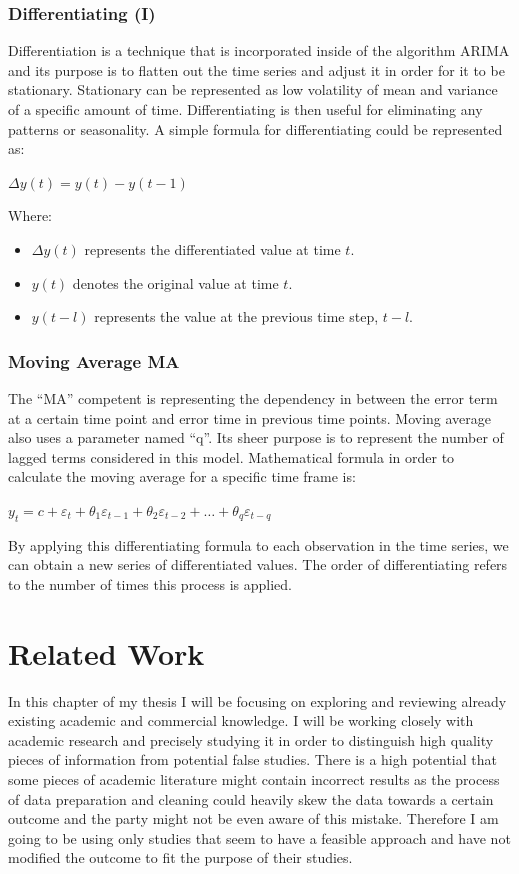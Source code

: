 \documentclass{imc-inf}
\begin{document}
	\subsection{Differentiating (I)}
	Differentiation is a technique that is incorporated inside of the algorithm ARIMA and its purpose is to flatten out the time series and
	adjust it in order for it to be stationary. Stationary can be represented as low volatility of mean and variance of a specific amount of time.
	Differentiating is then useful for eliminating any patterns or seasonality. A simple formula for differentiating could be represented as: 
	
	$\Delta y(t) = y(t) - y(t-1)$
	
	Where:
	\begin{itemize}
		\item $\Delta y(t)$ represents the differentiated value at time $t$.
		\item $y(t)$ denotes the original value at time $t$.
		\item $y(t-l)$ represents the value at the previous time step, $t-l$.
	\end{itemize}
	
	\subsection{Moving Average {MA}}
	The “MA” competent is representing the dependency in between the error term at a certain time point and error time in previous time points.
	Moving average also uses a parameter named “q”. Its sheer purpose is to represent the number of lagged terms considered in this model.
	Mathematical formula in order to calculate the moving average for a specific time frame is:
	
	$y_t = c + \varepsilon_t + \theta_1 \varepsilon_{t-1} + \theta_2 \varepsilon_{t-2} + \ldots + \theta_q \varepsilon_{t-q}$
	
	By applying this differentiating formula to each observation in the time series, we can obtain a new series of differentiated values.
	The order of differentiating refers to the number of times this process is applied. 
	
	
	
	\chapter{Related Work}\label{chap:related_work}
	In this chapter of my thesis I will be focusing on exploring and reviewing already existing academic and commercial knowledge. 
	I will be working closely with academic research and precisely studying it in order to distinguish high quality pieces of information 
	from potential false studies. There is a high potential that some pieces of academic literature might contain incorrect results as the process
	of data preparation and cleaning could heavily skew the data towards a certain outcome and the party might not be even aware of this mistake.
	Therefore I am going to be using only studies that seem to have a feasible approach and have not modified the outcome to fit the purpose
	of their studies.
	
\end{document}
